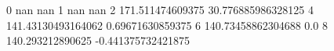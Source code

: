 0 nan nan
1 nan nan
2 171.511474609375 30.776885986328125
4 141.43130493164062 0.69671630859375
6 140.73458862304688 0.0
8 140.293212890625 -0.441375732421875

